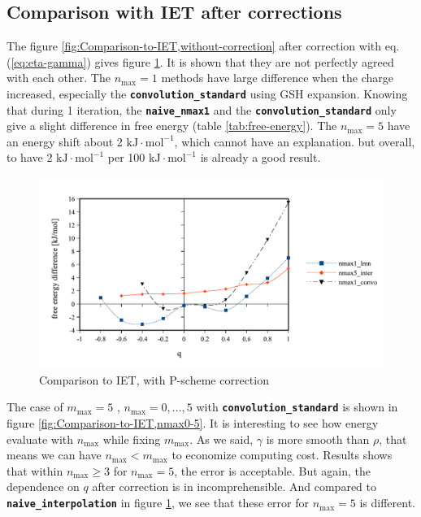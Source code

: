 \subsection{Comparison with IET after corrections}

The figure \ref{fig:Comparison-to-IET,without-correction} after correction
with eq. (\ref{eq:eta-gamma}) gives figure \ref{fig:Comparison-to-IET,with-corr}.
It is shown that they are not perfectly agreed with each other. The
$n_{\max}=1$ methods have large difference when the charge increased,
especially the \texttt{\textbf{convolution\_standard}} using GSH expansion.
Knowing that during 1 iteration, the \texttt{\textbf{naive\_nmax1}}
and the \texttt{\textbf{convolution\_standard}} only give a slight
difference in free energy (table \ref{tab:free-energy}). The $n_{\max}=5$
have an energy shift about 2 $\mathrm{kJ}\cdot\mathrm{mol^{-1}}$,
which cannot have an explanation. but overall, to have 2 $\mathrm{kJ}\cdot\mathrm{mol^{-1}}$
per 100 $\mathrm{kJ}\cdot\mathrm{mol^{-1}}$ is already a good result.

\begin{figure}[H]
\begin{centering}
\includegraphics[bb=0bp 20bp 510bp 263bp,scale=0.6]{_figure/results/ch4_diff_inter}
\par\end{centering}
\caption{Comparison to IET, with P-scheme correction\label{fig:Comparison-to-IET,with-corr}}
\end{figure}

The case of $m_{\max}=5$ , $n_{\max}=0,\ldots,5$ with \texttt{\textbf{convolution\_standard}}
is shown in figure \ref{fig:Comparison-to-IET,nmax0-5}. It is interesting
to see how energy evaluate with $n_{\max}$ while fixing $m_{\max}$.
As we said, $\gamma$ is more smooth than $\rho$, that means we can
have $n_{\max}<m_{\max}$ to economize computing cost. Results shows
that within $n_{\max}\geq3$ for $n_{\max}=5$, the error is acceptable.
But again, the dependence on $q$ after correction is in incomprehensible.
And compared to \texttt{\textbf{naive\_interpolation}} in figure \ref{fig:Comparison-to-IET,with-corr},
we see that these error for $n_{\max}=5$ is different.

